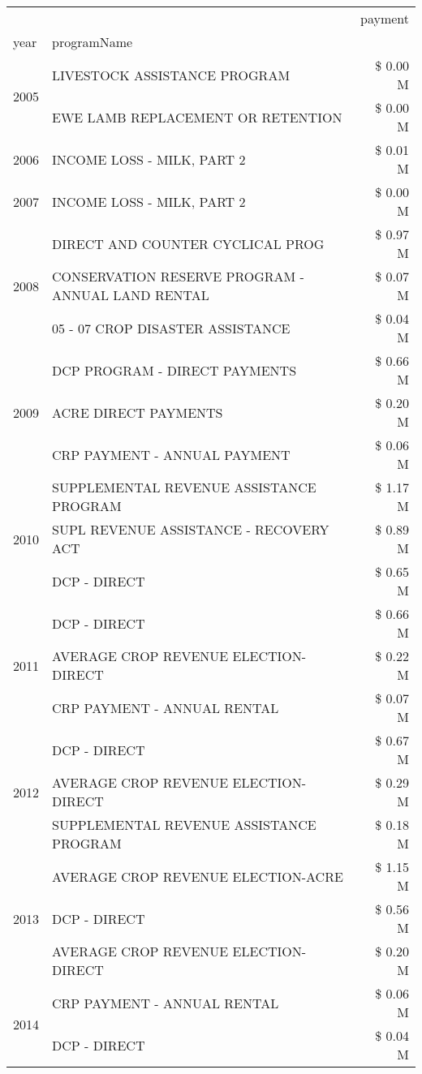 \begin{tabular}{llr}
\toprule
 &  & payment \\
year & programName &  \\
\midrule
\multirow[t]{2}{*}{2005} & LIVESTOCK ASSISTANCE PROGRAM & \$ 0.00 M \\
 & EWE LAMB REPLACEMENT OR RETENTION & \$ 0.00 M \\
\cline{1-3}
2006 & INCOME LOSS - MILK, PART 2 & \$ 0.01 M \\
\cline{1-3}
2007 & INCOME LOSS - MILK, PART 2 & \$ 0.00 M \\
\cline{1-3}
\multirow[t]{3}{*}{2008} & DIRECT AND COUNTER CYCLICAL PROG & \$ 0.97 M \\
 & CONSERVATION RESERVE PROGRAM - ANNUAL LAND RENTAL & \$ 0.07 M \\
 & 05 - 07 CROP DISASTER ASSISTANCE & \$ 0.04 M \\
\cline{1-3}
\multirow[t]{3}{*}{2009} & DCP PROGRAM - DIRECT PAYMENTS & \$ 0.66 M \\
 & ACRE DIRECT PAYMENTS & \$ 0.20 M \\
 & CRP PAYMENT - ANNUAL PAYMENT & \$ 0.06 M \\
\cline{1-3}
\multirow[t]{3}{*}{2010} & SUPPLEMENTAL REVENUE ASSISTANCE PROGRAM & \$ 1.17 M \\
 & SUPL REVENUE ASSISTANCE - RECOVERY ACT & \$ 0.89 M \\
 & DCP - DIRECT & \$ 0.65 M \\
\cline{1-3}
\multirow[t]{3}{*}{2011} & DCP - DIRECT & \$ 0.66 M \\
 & AVERAGE CROP REVENUE ELECTION-DIRECT & \$ 0.22 M \\
 & CRP PAYMENT - ANNUAL RENTAL & \$ 0.07 M \\
\cline{1-3}
\multirow[t]{3}{*}{2012} & DCP - DIRECT & \$ 0.67 M \\
 & AVERAGE CROP REVENUE ELECTION-DIRECT & \$ 0.29 M \\
 & SUPPLEMENTAL REVENUE ASSISTANCE PROGRAM & \$ 0.18 M \\
\cline{1-3}
\multirow[t]{3}{*}{2013} & AVERAGE CROP REVENUE ELECTION-ACRE & \$ 1.15 M \\
 & DCP - DIRECT & \$ 0.56 M \\
 & AVERAGE CROP REVENUE ELECTION-DIRECT & \$ 0.20 M \\
\cline{1-3}
\multirow[t]{3}{*}{2014} & CRP PAYMENT - ANNUAL RENTAL & \$ 0.06 M \\
 & DCP - DIRECT & \$ 0.04 M \\

\end{tabular}
